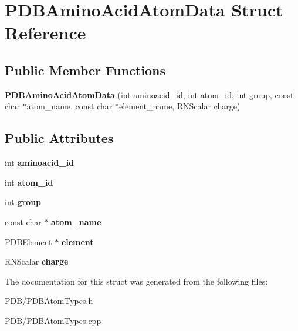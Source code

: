 \hypertarget{struct_p_d_b_amino_acid_atom_data}{}\section{P\+D\+B\+Amino\+Acid\+Atom\+Data Struct Reference}
\label{struct_p_d_b_amino_acid_atom_data}
\subsection*{Public Member Functions}
\begin{DoxyCompactItemize}
\item 
{\bfseries P\+D\+B\+Amino\+Acid\+Atom\+Data} (int aminoacid\+\_\+id, int atom\+\_\+id, int group, const char $\ast$atom\+\_\+name, const char $\ast$element\+\_\+name, R\+N\+Scalar charge)\hypertarget{struct_p_d_b_amino_acid_atom_data_a101d399a3387e67f9ab3b352201886f9}{}\label{struct_p_d_b_amino_acid_atom_data_a101d399a3387e67f9ab3b352201886f9}

\end{DoxyCompactItemize}
\subsection*{Public Attributes}
\begin{DoxyCompactItemize}
\item 
int {\bfseries aminoacid\+\_\+id}\hypertarget{struct_p_d_b_amino_acid_atom_data_ad2c54ad015eca08e0df3ebbff1b7b140}{}\label{struct_p_d_b_amino_acid_atom_data_ad2c54ad015eca08e0df3ebbff1b7b140}

\item 
int {\bfseries atom\+\_\+id}\hypertarget{struct_p_d_b_amino_acid_atom_data_ad134bedc7b9a277f4a4f39ad6935c002}{}\label{struct_p_d_b_amino_acid_atom_data_ad134bedc7b9a277f4a4f39ad6935c002}

\item 
int {\bfseries group}\hypertarget{struct_p_d_b_amino_acid_atom_data_a9f59f791598012fa53203d8555bac6fd}{}\label{struct_p_d_b_amino_acid_atom_data_a9f59f791598012fa53203d8555bac6fd}

\item 
const char $\ast$ {\bfseries atom\+\_\+name}\hypertarget{struct_p_d_b_amino_acid_atom_data_a39f57615f0cbd1d8612b47ea6701fa5f}{}\label{struct_p_d_b_amino_acid_atom_data_a39f57615f0cbd1d8612b47ea6701fa5f}

\item 
\hyperlink{class_p_d_b_element}{P\+D\+B\+Element} $\ast$ {\bfseries element}\hypertarget{struct_p_d_b_amino_acid_atom_data_a5918924b7b727be2a0aa16b415d903b1}{}\label{struct_p_d_b_amino_acid_atom_data_a5918924b7b727be2a0aa16b415d903b1}

\item 
R\+N\+Scalar {\bfseries charge}\hypertarget{struct_p_d_b_amino_acid_atom_data_aa4a4ae90e3f66c6d89dd122860529d8e}{}\label{struct_p_d_b_amino_acid_atom_data_aa4a4ae90e3f66c6d89dd122860529d8e}

\end{DoxyCompactItemize}


The documentation for this struct was generated from the following files\+:\begin{DoxyCompactItemize}
\item 
P\+D\+B/P\+D\+B\+Atom\+Types.\+h\item 
P\+D\+B/P\+D\+B\+Atom\+Types.\+cpp\end{DoxyCompactItemize}
